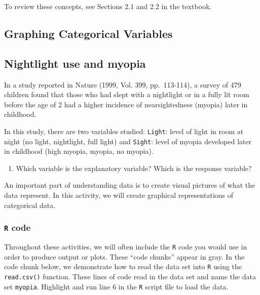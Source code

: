 \documentclass[
]{report}
\providecommand{\tightlist}{%
  \setlength{\itemsep}{0pt}\setlength{\parskip}{0pt}}
\begin{document}
To review these concepts, see Sections 2.1 and 2.2 in the textbook.

\hypertarget{graphing-categorical-variables}{%
\subsection{Graphing Categorical Variables}\label{graphing-categorical-variables}}

\hypertarget{nightlight-use-and-myopia}{%
\subsection*{Nightlight use and myopia}\label{nightlight-use-and-myopia}}

In a study reported in Nature (1999, Vol. 399, pp.~113-114), a survey of 479 children found that those who had slept with a nightlight or in a fully lit room before the age of 2 had a higher incidence of nearsightedness (myopia) later in childhood.

In this study, there are two variables studied: \texttt{Light}: level of light in room at night (no light, nightlight, full light) and \texttt{Sight}: level of myopia developed later in childhood (high myopia, myopia, no myopia).

\begin{enumerate}
\def\labelenumi{\arabic{enumi}.}
\tightlist
\item
  Which variable is the explanatory variable? Which is the response variable?
\end{enumerate}

\vspace{0.8in}

An important part of understanding data is to create visual pictures of what the data represent. In this activity, we will create graphical representations of categorical data.

\hypertarget{r-code}{%
\subsubsection*{\texorpdfstring{\texttt{R} code}{R code}}\label{r-code}}

Throughout these activities, we will often include the \texttt{R} code you would use in order to produce output or plots. These ``code chunks'' appear in gray. In the code chunk below, we demonstrate how to read the data set into \texttt{R} using the \texttt{read.csv()} function. These lines of code read in the data set and name the data set \texttt{myopia}. Highlight and run line 6 in the \texttt{R} script file to load the data.
\end{document}
